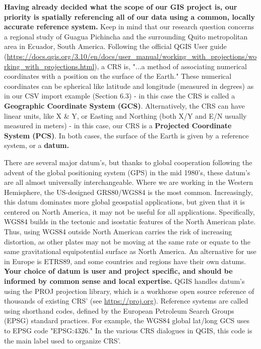 \documentclass{article}
\begin{document}
\textbf{Having already decided what the scope of our GIS project is, our priority is spatially referencing all of our data using a common, locally accurate reference system.} Keep in mind that our research question concerns a regional study of Guagua Pichincha and the surrounding Quito metropolitan area in Ecuador, South America. Following the official QGIS User guide (\url{https://docs.qgis.org/3.10/en/docs/user_manual/working_with_projections/working_with_projections.html}), a CRS is, "...a method of associating numerical coordinates with a position on the surface of the Earth." These numerical coordinates can be spherical like latitude and longitude (measured in degrees) as in our CSV import example (Section 6.3) - in this case the CRS is called a \textbf{Geographic Coordinate System (GCS)}. Alternatively, the CRS can have linear units, like X \& Y, or Easting and Northing (both X/Y and E/N usually measured in meters) - in this case, our CRS is a \textbf{Projected Coordinate System (PCS)}. In both cases, the surface of the Earth is given by a reference system, or a \textbf{datum.} 

There are several major datum's, but thanks to global cooperation following the advent of the global positioning system (GPS) in the mid 1980's, these datum's are all almost universally interchangeable. Where we are working in the Western Hemisphere, the US-designed GRS80/WGS84 is the most common. Increasingly, this datum dominates more global geospatial applications, but given that it is centered on North America, it may not be useful for all applications. Specifically, WGS84 builds in the tectonic and isostatic features of the North American plate. Thus, using WGS84 outside North American carries the risk of increasing distortion, as other plates may not be moving at the same rate or equate to the same gravitational equipotential surface as North America. An alternative for use in Europe is ETRS89, and some countries and regions have their own datums. \textbf{Your choice of datum is user and project specific, and should be informed by common sense and local expertise.} QGIS handles datum's using the PROJ projection library, which is a workhorse open source reference of thousands of existing CRS' (see \url{https://proj.org}). Reference systems are called using shorthand codes, defined by the European Petroleum Search Groups (EPSG) standard practices. For example, the WGS84 global lat/long GCS uses to EPSG code "EPSG:4326." In the various CRS dialogues in QGIS, this code is the main label used to organize CRS'. 
\end{document}
